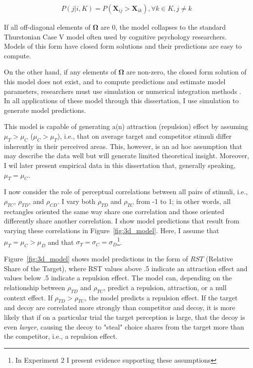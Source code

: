 \begin{align}
   P(j|i,K)=P(\mathbf{X}_{ij}>\mathbf{X}_{ik}), \forall k \in K, j \neq k
   \label{eqn:pchoice}
\end{align}

If all off-diagonal elements of $\boldsymbol{\Omega}$ are $0$, the model collapses to the standard Thurstonian Case V model \parencite{thurstone1927law} often used by cognitive psychology researchers. Models of this form have closed form solutions and their predictions are easy to compute.

On the other hand, if any elements of $\boldsymbol{\Omega}$ are non-zero, the closed form solution of this model does not exist, and to compute predictions and estimate model parameters, researchers must use simulation or numerical integration methods \parencite{train2009discrete}. In all applications of these model through this dissertation, I use simulation to generate model predictions. 

This model is capable of generating a(n) attraction (repulsion) effect by assuming $\mu_{T}>\mu_{C}$ ($\mu_{C}>\mu_{T}$), i.e., that on average target and competitor stimuli differ inherently in their perceived areas. This, however, is an ad hoc assumption that may describe the data well but will generate limited theoretical insight. Moreover, I wil later present empirical data in this dissertation that, generally speaking, $\mu_{T}=\mu_{C}$. 

I now consider the role of perceptual correlations between all pairs of stimuli, i.e., $\rho_{TC}$, $\rho_{TD}$, and $\rho_{CD}$. I vary both $\rho_{TD}$ and $\rho_{TC}$ from -1 to 1; in other words, all rectangles oriented the same way share one correlation and those oriented differently share another correlation. I show model predictions that result from varying these correlations in Figure~\ref{fig:3d_model}. Here, I assume that $\mu_{T}=\mu_{C}>\mu_{D}$ and that $\sigma_{T}=\sigma_{C}=\sigma_{D}$\footnote{In Experiment 2 I present evidence supporting these assumptions}. 

Figure~\ref{fig:3d_model} shows model predictions in the form of $RST$ (Relative Share of the Target), where RST values above .5 indicate an attraction effect and values below .5 indicate a repulsion effect. The model can, depending on the relationship between $\rho_{TD}$ and $\rho_{TC}$, predict a repulsion, attraction, or a null context effect. If $\rho_{TD}>\rho_{TC}$, the model predicts a repulsion effect. If the target and decoy are correlated more strongly than competitor and decoy, it is more likely that if on a particular trial the target perception is large, that the decoy is even \textit{larger}, causing the decoy to "steal" choice shares from the target more than the competitor, i.e., a repulsion effect.

